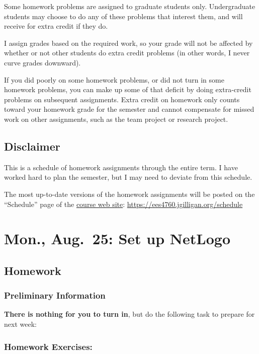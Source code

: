 \documentclass[
]{article}
\begin{document}
Some homework problems are assigned to graduate students only.
Undergraduate students may choose to do any of these problems that
interest them, and will receive for extra credit if they do.

I assign grades based on the required work, so your grade will not be
affected by whether or not other students do extra credit problems (in
other words, I never curve grades downward).

If you did poorly on some homework problems, or did not turn in some
homework problems, you can make up some of that deficit by doing
extra-credit problems on subsequent assignments. Extra credit on
homework only counts toward your homework grade for the semester and
cannot compensate for missed work on other assignments, such as the team
project or research project.

\subsection{Disclaimer}\label{disclaimer}

This is a schedule of homework assignments through the entire term. I
have worked hard to plan the semester, but I may need to deviate from
this schedule.

The most up-to-date versions of the homework assignments will be posted
on the ``Schedule'' page of the
\href{https://ees4760.jgilligan.org/schedule}{course web site}:
\url{https://ees4760.jgilligan.org/schedule}

\section{Mon., Aug.~25: Set up
NetLogo}\label{mon.-aug.-25-set-up-netlogo}

\subsection{Homework}\label{homework}

\subsubsection{Preliminary Information}\label{preliminary-information}

\textbf{There is nothing for you to turn in}, but do the following task
to prepare for next week:

\subsubsection{Homework Exercises:}\label{homework-exercises}
\end{document}
